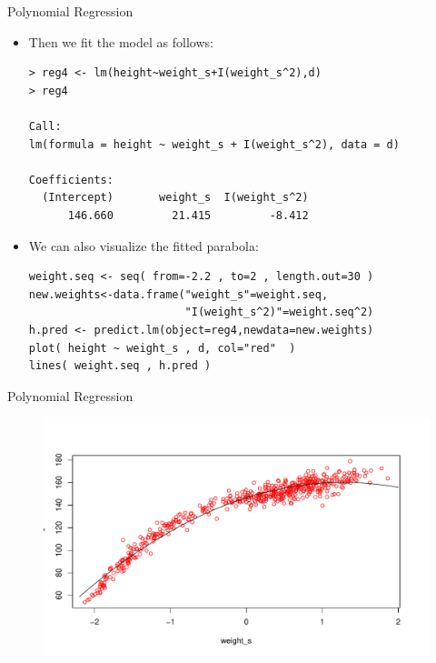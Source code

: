 \documentclass[handout]{beamer}
\begin{document}
\begin{frame}[fragile]{Polynomial Regression}
\scriptsize{ 
\begin{itemize}

 


\item Then we fit the model as follows:
\begin{verbatim}
> reg4 <- lm(height~weight_s+I(weight_s^2),d) 
> reg4

Call:
lm(formula = height ~ weight_s + I(weight_s^2), data = d)

Coefficients:
  (Intercept)       weight_s  I(weight_s^2)  
      146.660         21.415         -8.412
\end{verbatim}

 \item We can also visualize the fitted parabola:

\begin{verbatim}
weight.seq <- seq( from=-2.2 , to=2 , length.out=30 )
new.weights<-data.frame("weight_s"=weight.seq,
                        "I(weight_s^2)"=weight.seq^2)
h.pred <- predict.lm(object=reg4,newdata=new.weights)
plot( height ~ weight_s , d, col="red"  )
lines( weight.seq , h.pred )
\end{verbatim}
 
\end{itemize}


}
\end{frame}

\begin{frame}[fragile]{Polynomial Regression}
\scriptsize{ 

\begin{figure}[h!]
	\centering
	\includegraphics[scale=0.55]{pics/parabola.pdf}
\end{figure}




}
\end{frame}
\end{document}
